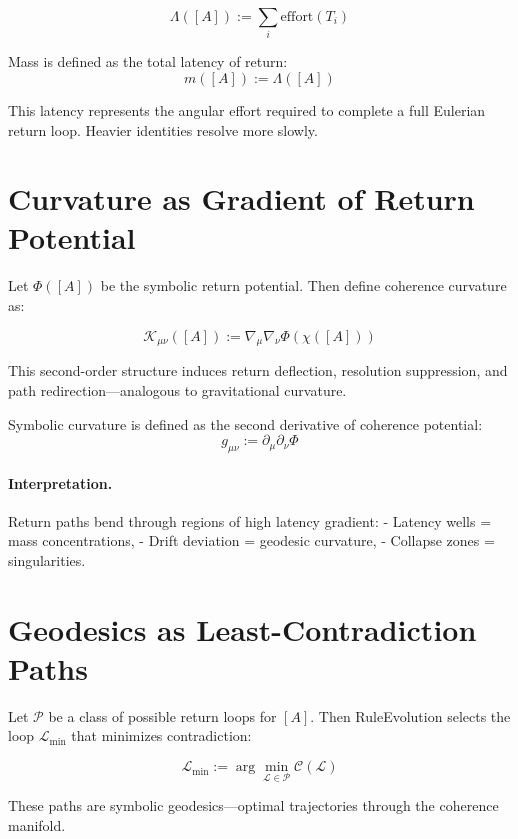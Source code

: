 \[
\Lambda([A]) := \sum_i \text{effort}(T_i)
\]

\begin{definition}
Mass is defined as the total latency of return:
\[
m([A]) := \Lambda([A])
\]
\end{definition}

This latency represents the angular effort required to complete a full Eulerian return loop. Heavier identities resolve more slowly.

\section{Curvature as Gradient of Return Potential}

Let $\Phi([A])$ be the symbolic return potential. Then define coherence curvature as:

\[
\mathcal{K}_{\mu\nu}([A]) := \nabla_\mu \nabla_\nu \Phi(\chi([A]))
\]

This second-order structure induces return deflection, resolution suppression, and path redirection—analogous to gravitational curvature.

\begin{definition}
Symbolic curvature is defined as the second derivative of coherence potential:
\[
g_{\mu\nu} := \partial_\mu \partial_\nu \Phi
\]
\end{definition}

\paragraph{Interpretation.}
Return paths bend through regions of high latency gradient:
- Latency wells = mass concentrations,
- Drift deviation = geodesic curvature,
- Collapse zones = singularities.

\section{Geodesics as Least-Contradiction Paths}

Let $\mathcal{P}$ be a class of possible return loops for $[A]$. Then RuleEvolution selects the loop $\mathcal{L}_\text{min}$ that minimizes contradiction:

\[
\mathcal{L}_\text{min} := \arg \min_{\mathcal{L} \in \mathcal{P}} \mathcal{C}(\mathcal{L})
\]

These paths are symbolic geodesics—optimal trajectories through the coherence manifold.

